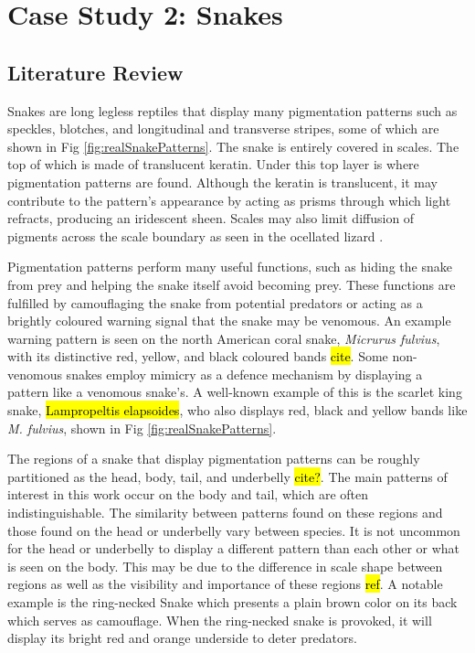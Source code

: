 \chapter{Case Study 2: Snakes}
\section{Literature Review}
Snakes are long legless reptiles that display many pigmentation patterns such as speckles, blotches, and longitudinal and transverse stripes, some of which are shown in Fig \ref{fig:realSnakePatterns}. The snake is entirely covered in scales. The top of which is made of translucent keratin. Under this top layer is where pigmentation patterns are found. Although the keratin is translucent, it may contribute to the pattern's appearance by acting as prisms through which light refracts, producing an iridescent sheen. Scales may also limit diffusion of pigments across the scale boundary as seen in the ocellated lizard \cite{manukyan2017}.

Pigmentation patterns perform many useful functions, such as hiding the snake from prey and helping the snake itself avoid becoming prey. These functions are fulfilled by camouflaging the snake from potential predators or acting as a brightly coloured warning signal that the snake may be venomous. An example warning pattern is seen on the north American coral snake, \textit{Micrurus fulvius}, with its distinctive red, yellow, and black coloured bands \hl{cite}. Some non-venomous snakes employ mimicry as a defence mechanism by displaying a pattern like a venomous snake’s. A well-known example of this is the scarlet king snake, \hl{Lampropeltis elapsoides}, who also displays red, black and yellow bands like \textit{M. fulvius}, shown in Fig \ref{fig:realSnakePatterns}.

The regions of a snake that display pigmentation patterns can be roughly partitioned as the head, body, tail, and underbelly \hl{cite?}. The main patterns of interest in this work occur on the body and tail, which are often indistinguishable. The similarity between patterns found on these regions and those found on the head or underbelly vary between species. It is not uncommon for the head or underbelly to display a different pattern than each other or what is seen on the body. This may be due to the difference in scale shape between regions as well as the visibility and importance of these regions \hl{ref}. A notable example is the ring-necked Snake which presents a plain brown color on its back which serves as camouflage. When the ring-necked snake is provoked, it will display its bright red and orange underside to deter predators.

